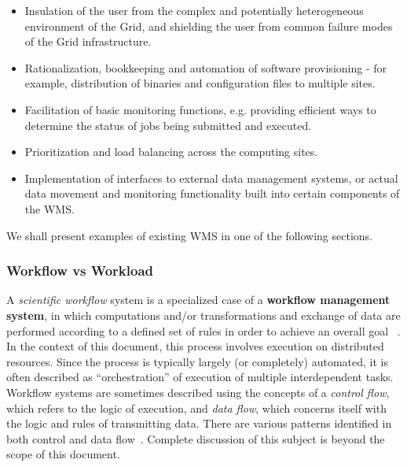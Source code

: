 \begin{itemize}

\item Insulation of the user from the complex and potentially heterogeneous environment of the Grid, and shielding the user from common failure modes of the Grid infrastructure.

\item Rationalization, bookkeeping and automation of software provisioning - for example, distribution of binaries and configuration files to multiple sites.

\item Facilitation of basic monitoring functions, e.g. providing efficient ways to determine the status of jobs being submitted and executed.

\item Prioritization and load balancing across the computing sites.

\item Implementation of interfaces to external data management systems, or actual data movement and monitoring functionality built into certain components of the WMS.

\end{itemize}

We shall present examples of existing WMS in one of the following sections.

\subsubsection{Workflow vs Workload}
\label{workflow_workload}
A \textit{scientific workflow} system is a specialized case of a \textbf{workflow management system}, in which computations and/or transformations and exchange of data are performed according to a defined set of rules
in order to achieve an overall goal ~\cite{grid_workflow_taxonomy,grid_workflow_fit,pegasus}. In the context of this document, this process involves execution on distributed resources. Since the process is
typically largely (or completely) automated, it is often described as ``orchestration'' of execution of multiple interdependent tasks. Workflow systems are sometimes described using the concepts of a \textit{control flow},
which refers to the logic of execution, and \textit{data flow}, which concerns itself with the logic and rules of transmitting data. There are various patterns identified in both control and data flow~\cite{workflow_patterns}.
Complete discussion of this subject is beyond the scope of this document.

